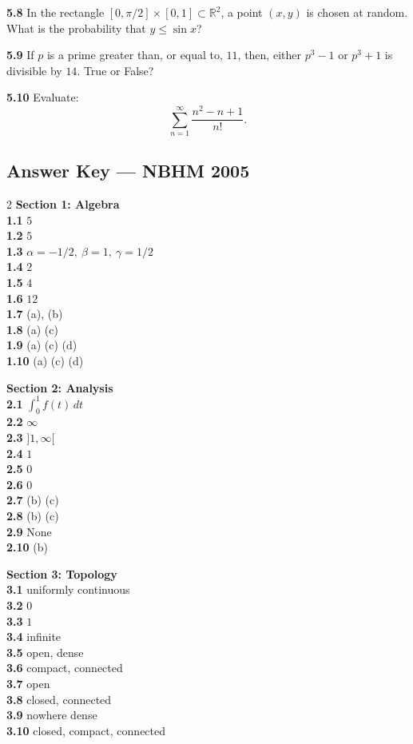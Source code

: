 \documentclass[11pt,a4paper]{article}
\newcommand{\R}{\mathbb{R}}
\newcommand{\examsec}[1]{%
  \subsection*{#1}
  \vspace{-2pt}
}
\newcommand{\qitem}[1]{\par\medskip\noindent\textbf{#1}\hspace{0.5em}}
\begin{document}
\qitem{5.8} In the rectangle $[0, \pi/2] \times [0, 1] \subset \R^2$, a point $(x, y)$ is chosen at random. What is the probability that $y \le \sin x$?

\qitem{5.9} If $p$ is a prime greater than, or equal to, $11$, then, either $p^3 - 1$ or $p^3 + 1$ is divisible by $14$. True or False?

\qitem{5.10} Evaluate:
\[
  \sum_{n=1}^{\infty} \frac{n^2 - n + 1}{n!}.
\]

\examsec{Answer Key --- NBHM 2005}
\begin{multicols}{2}
\textbf{Section 1: Algebra}\\
\textbf{1.1} $5$\\
\textbf{1.2} $5$\\
\textbf{1.3} $\alpha = -1/2,\ \beta = 1,\ \gamma = 1/2$\\
\textbf{1.4} $2$\\
\textbf{1.5} $4$\\
\textbf{1.6} $12$\\
\textbf{1.7} (a), (b)\\
\textbf{1.8} (a) (c)\\
\textbf{1.9} (a) (c) (d)\\
\textbf{1.10} (a) (c) (d)

\medskip
\textbf{Section 2: Analysis}\\
\textbf{2.1} $\int_0^1 f(t)\,dt$\\
\textbf{2.2} $\infty$\\
\textbf{2.3} $]1, \infty[$\\
\textbf{2.4} $1$\\
\textbf{2.5} $0$\\
\textbf{2.6} $0$\\
\textbf{2.7} (b) (c)\\
\textbf{2.8} (b) (c)\\
\textbf{2.9} None\\
\textbf{2.10} (b)

\medskip
\textbf{Section 3: Topology}\\
\textbf{3.1} uniformly continuous\\
\textbf{3.2} $0$\\
\textbf{3.3} $1$\\
\textbf{3.4} infinite\\
\textbf{3.5} open, dense\\
\textbf{3.6} compact, connected\\
\textbf{3.7} open\\
\textbf{3.8} closed, connected\\
\textbf{3.9} nowhere dense\\
\textbf{3.10} closed, compact, connected


\end{multicols}
\end{document}
